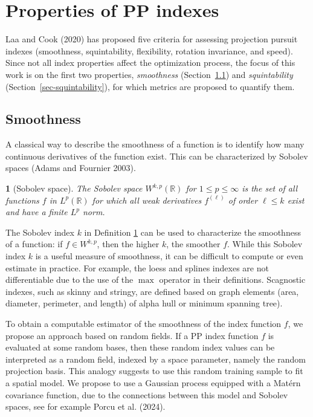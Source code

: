 \documentclass[
  12pt,
]{interact}
\theoremstyle{plain}
\newtheorem{defn}{\protect\definitionname}
\providecommand{\definitionname}{Definition}
\begin{document}
\section{Properties of PP indexes}\label{sec-PP-properties}

Laa and Cook (2020) has proposed five criteria for assessing projection
pursuit indexes (smoothness, squintability, flexibility, rotation
invariance, and speed). Since not all index properties affect the
optimization process, the focus of this work is on the first two
properties, \emph{smoothness} (Section~\ref{sec-smoothness}) and
\emph{squintability} (Section~\ref{sec-squintability}), for which
metrics are proposed to quantify them.

\subsection{Smoothness}\label{sec-smoothness}

A classical way to describe the smoothness of a function is to identify
how many continuous derivatives of the function exist. This can be
characterized by Sobolev spaces (Adams and Fournier 2003).

\begin{defn}[Sobolev space]\label{def:sobolev_space}
The Sobolev space $W^{k,p}(\mathbb{R})$ for $1\leq p\leq \infty$ is the set of all functions $f$ in $L^p(\mathbb{R})$ for which all weak derivatives $f^{(\ell)}$ of order $\ell\leq k$ exist and have a finite $L^p$ norm.
\end{defn}

The Sobolev index \(k\) in Definition \ref{def:sobolev_space} can be
used to characterize the smoothness of a function: if \(f\in W^{k,p}\),
then the higher \(k\), the smoother \(f\). While this Sobolev index
\(k\) is a useful measure of smoothness, it can be difficult to compute
or even estimate in practice. For example, the loess and splines indexes
are not differentiable due to the use of the \(\max\) operator in their
definitions. Scagnostic indexes, such as skinny and stringy, are defined
based on graph elements (area, diameter, perimeter, and length) of alpha
hull or minimum spanning tree).

To obtain a computable estimator of the smoothness of the index function
\(f\), we propose an approach based on random fields. If a PP index
function \(f\) is evaluated at some random bases, then these random
index values can be interpreted as a random field, indexed by a space
parameter, namely the random projection basis. This analogy suggests to
use this random training sample to fit a spatial model. We propose to
use a Gaussian process equipped with a Matérn covariance function, due
to the connections between this model and Sobolev spaces, see for
example Porcu et al. (2024).
\end{document}
